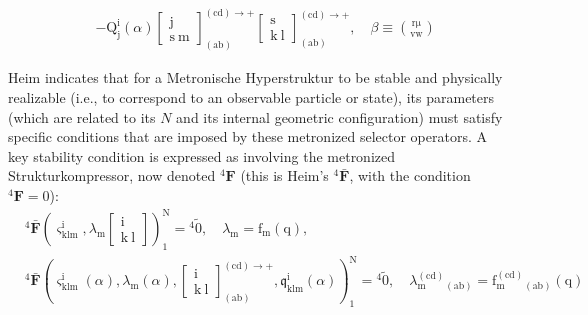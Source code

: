 \documentclass[12pt]{article}
\newcommand{\metronisiertekondensor}[1]{{}^{#1}\mathbf{F}} %
\begin{document}
\begin{itemize}
\begin{equation}
\begin{aligned}
    & - \mathrm{Q}^{\mathrm{i}}_{\mathrm{j}}(\alpha) \left[ \begin{matrix} \mathrm{j} \\ \mathrm{s\ m} \end{matrix} \right]^{(\mathrm{cd}) \rightarrow +}_{(\mathrm{ab})} \left[ \begin{matrix} \mathrm{s} \\ \mathrm{k\ l} \end{matrix} \right]^{(\mathrm{cd}) \rightarrow +}_{(\mathrm{ab})}, \quad \beta \equiv \binom{\mathrm{r\mu}}{\mathrm{vw}}
    \end{aligned} \tag{99b}
    \end{equation}

    Heim indicates that for a Metronische Hyperstruktur to be stable and physically realizable (i.e., to correspond to an observable particle or state), its parameters (which are related to its  \(N\) and its internal geometric configuration) must satisfy specific conditions that are imposed by these metronized selector operators. A key stability condition is expressed as involving the metronized Strukturkompressor, now denoted \( \metronisiertekondensor{4} \) (this is Heim's \( {}^4\bar{\mathbf{F}} \), with the condition \( \metronisiertekondensor{4}=0 \)):
    \begin{equation}
    \begin{aligned}
    & {}^4\bar{\mathbf{F}} \left( \varsigma^{\mathrm{i}}_{\mathrm{klm}}, \lambda_\mathrm{m} \left[ \begin{matrix} \mathrm{i} \\ \mathrm{k\ l} \end{matrix} \right] \right)_1^\mathrm{N} = {}^4\tilde{0}, \quad \lambda_\mathrm{m} = \mathrm{f_m}(\mathrm{q}), \\
    & {}^4\bar{\mathbf{F}} \left( \varsigma^{\mathrm{i}}_{\mathrm{klm}}(\alpha), \lambda_\mathrm{m}(\alpha), \left[ \begin{matrix} \mathrm{i} \\ \mathrm{k\ l} \end{matrix} \right]^{(\mathrm{cd}) \rightarrow +}_{(\mathrm{ab})}, \mathfrak{q}^{\mathrm{i}}_{\mathrm{klm}}(\alpha) \right)_1^\mathrm{N} = {}^4\tilde{0}, \quad \lambda_{\mathrm{m}}^{(\mathrm{cd})}_{(\mathrm{ab})} = \mathrm{f}_{\mathrm{m}}^{(\mathrm{cd})}_{(\mathrm{ab})}(\mathrm{q})
    \end{aligned} \tag{100}
    \label{eq:original_final_stability_condition}
    \end{equation}

\end{itemize}
\end{document}
